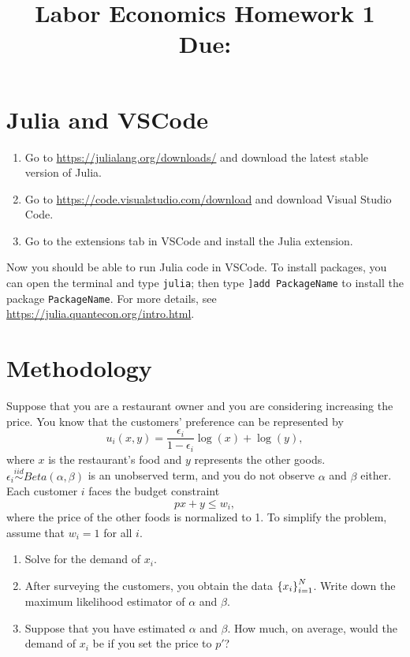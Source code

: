 \documentclass[12pt]{article}
\title{
    Labor Economics Homework 1 \\
    \large Due: \\
    }
\author{}
\date{}
\begin{document}

\maketitle
\vspace{-2cm}

\section{Julia and VSCode}
\begin{enumerate}
    \item Go to \url{https://julialang.org/downloads/} and download the latest stable version of Julia. 
    \item Go to \url{https://code.visualstudio.com/download} and download Visual Studio Code.
    \item Go to the extensions tab in VSCode and install the Julia extension.
\end{enumerate}
Now you should be able to run Julia code in VSCode. To install 
packages, you can open the terminal and type \texttt{julia}; then 
type \texttt{]add PackageName} to install the package 
\texttt{PackageName}. For more details, see 
\url{https://julia.quantecon.org/intro.html}.

\section{Methodology}
Suppose that you are a restaurant owner and you are considering 
increasing the price. You know that the customers' preference 
can be represented by 
\begin{equation*}
    u_i(x, y) = \frac{\epsilon_i}{1-\epsilon_i}\log (x) + \log (y), 
\end{equation*}
where $x$ is the restaurant's food and $y$ represents the other 
goods. $\epsilon_i\overset{iid}{\sim}Beta(\alpha, \beta)$ is an 
unobserved term, and you do not observe $\alpha$ and $\beta$ 
either. Each customer $i$ faces the budget constraint
\begin{equation*}
    p x + y \leq w_i,
\end{equation*}
where the price of the other foods is normalized to 1. To 
simplify the problem, assume that $w_i = 1$ for all $i$.
\begin{enumerate}
    \item Solve for the demand of $x_i$.
    \item After surveying the customers, you obtain the data 
    $\left\{ {x_i} \right\}_{i=1}^N$. Write down the maximum likelihood estimator 
    of $\alpha$ and $\beta$.
    \item Suppose that you have estimated $\alpha$ and $\beta$. 
    How much, on average, would the demand of $x_i$ be if you 
    set the price to $p'$?
\end{enumerate}
\end{document}

